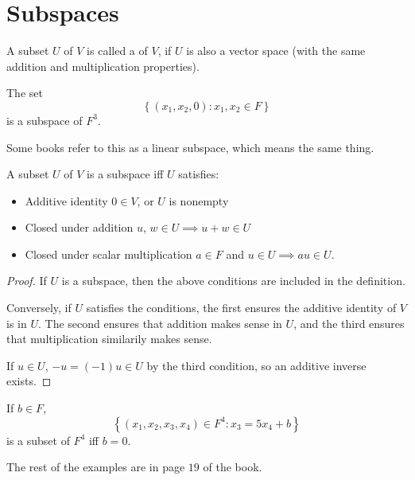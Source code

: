\section{Subspaces}

\begin{definition}[Subspace]
  A subset $U$ of $V$ is called a  of $V$, if $U$ is also a vector space 
  (with the same addition and multiplication properties).
\end{definition}

\begin{example}
  The set
  \begin{equation*}
    \left\{(x_{1}, x_{2}, 0) : x_{1}, x_{2} \in F\right\}
  \end{equation*}
  is a subspace of $F^{3}$.
\end{example}

Some books refer to this as a linear subspace, which means the same thing.

\begin{theorem}
  A subset $U$ of $V$ is a subspace iff $U$ satisfies: 
  \begin{itemize}
    \item Additive identity \; $0 \in V$, or $U$ is nonempty
    \item Closed under addition \; $u$, $w \in U \implies u + w \in U$
    \item Closed under scalar multiplication \; $a \in F$ and $u \in U \implies au \in U$.
  \end{itemize}
\end{theorem}

\begin{proof}
  If $U$ is a subspace, then the above conditions are included in the definition.

  Conversely, if $U$ satisfies the conditions, the first ensures the additive identity of $V$ is in $U$.
  The second ensures that addition makes sense in $U$, and the third ensures that multiplication similarily makes sense.

  If $u \in U$, $-u = (-1)u \in U$ by the third condition, so an additive inverse exists.
\end{proof}

\begin{example}[Subspaces]
  If $b \in F$, 
  \begin{equation*}
    \left\{(x_{1}, x_{2}, x_{3}, x_{4}) \in F^{4} : x_{3} = 5x_{4} + b\right\}
  \end{equation*}
  is a subset of $F^{4}$ iff $b = 0$.

  The rest of the examples are in page $19$ of the book.
\end{example}

